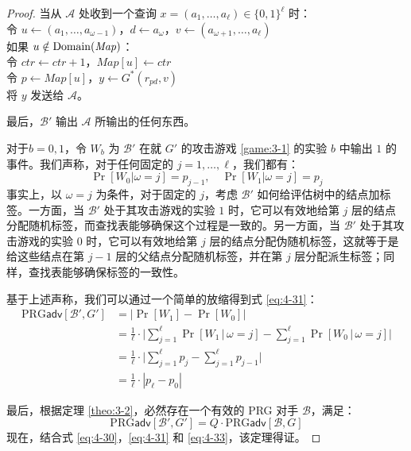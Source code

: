 \begin{proof}
\vspace{5pt}

\hspace*{29pt} 当从 $\mathcal{A}$ 处收到一个查询 $x=(a_1,\dots,a_\ell)\in\{0,1\}^\ell$ 时：\\
\hspace*{75pt} 令 $u\leftarrow(a_1,\dots,a_{\omega-1})$，$d\leftarrow a_\omega$，$v\leftarrow(a_{\omega+1},\dots,a_\ell)$\\
\hspace*{75pt} 如果 $u\notin{\rm Domain}(\mathit{Map})$：\\
\hspace*{100pt} 令 $\mathit{ctr}\leftarrow \mathit{ctr}+1$，$\mathit{Map}[u]\leftarrow\mathit{ctr}$\\
\hspace*{75pt} 令 $p\leftarrow\mathit{Map}[u]$，$y\leftarrow G^*(r_{pd},v)$\\
\hspace*{75pt} 将 $y$ 发送给 $\mathcal{A}$。

\vspace{5pt}

\hspace*{5pt} 最后，$\mathcal{B}'$ 输出 $\mathcal{A}$ 所输出的任何东西。

\vspace{10pt}

对于$b=0,1$，令 $W_b$ 为 $\mathcal{B}'$ 在就 $G'$ 的攻击游戏 \ref{game:3-1} 的实验 $b$ 中输出 $1$ 的事件。我们声称，对于任何固定的 $j=1,\dots,\ell$，我们都有：
\[
\Pr[W_0|\omega=j]=p_{j-1},
\quad
\Pr[W_1|\omega=j]=p_j
\]
事实上，以 $\omega=j$ 为条件，对于固定的 $j$，考虑 $\mathcal{B}'$ 如何给评估树中的结点加标签。一方面，当 $\mathcal{B}'$ 处于其攻击游戏的实验 $1$ 时，它可以有效地给第 $j$ 层的结点分配随机标签，而查找表能够确保这个过程是一致的。另一方面，当 $\mathcal{B}'$ 处于其攻击游戏的实验 $0$ 时，它可以有效地给第 $j$ 层的结点分配伪随机标签，这就等于是给这些结点在第 $j-1$ 层的父结点分配随机标签，并在第 $j$ 层分配派生标签；同样，查找表能够确保标签的一致性。

基于上述声称，我们可以通过一个简单的放缩得到式 \ref{eq:4-31}：
\[
\begin{aligned}
\mathrm{PRG}\mathsf{adv}[\mathcal{B}',G']
&=\big\lvert\Pr[W_1]-\Pr[W_0]\big\rvert\\
&=\frac{1}{\ell}\cdot\bigg\lvert\sum_{j=1}^\ell\Pr[W_1\,|\,\omega=j]-\sum_{j=1}^\ell\Pr[W_0\,|\,\omega=j]\bigg\rvert\\
&=\frac{1}{\ell}\cdot\bigg\lvert\sum_{j=1}^\ell p_j-\sum_{j=1}^\ell p_{j-1}\bigg\rvert\\
&=\frac{1}{\ell}\cdot|p_\ell-p_0|
\end{aligned}
\]

最后，根据定理 \ref{theo:3-2}，必然存在一个有效的 PRG 对手 $\mathcal{B}$，满足：
\begin{equation}\label{eq:4-33}
\mathrm{PRG}\mathsf{adv}[\mathcal{B}',G']
=Q\cdot
\mathrm{PRG}\mathsf{adv}[\mathcal{B},G]
\end{equation}
现在，结合式 \ref{eq:4-30}，\ref{eq:4-31} 和 \ref{eq:4-33}，该定理得证。
\end{proof}

